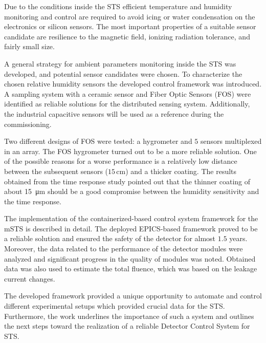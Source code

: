 Due to the conditions inside the \gls{STS} efficient temperature and humidity monitoring and control are required to avoid icing or water condensation on the electronics or silicon sensors. The most important properties of a suitable sensor candidate are resilience to the magnetic field, ionizing radiation tolerance, and fairly small size.

A general strategy for ambient parameters monitoring inside the \gls{STS} was developed, and potential sensor candidates were chosen. To characterize the chosen relative humidity sensors the developed control framework was introduced. A sampling system with a ceramic sensor and Fiber Optic Sensors (\gls{FOS}) were identified as reliable solutions for the distributed sensing system. Additionally, the industrial capacitive sensors will be used as a reference during the commissioning.

Two different designs of \gls{FOS} were tested: a hygrometer and $5$ sensors multiplexed in an array. The \gls{FOS} hygrometer turned out to be a more reliable solution. One of the possible reasons for a worse performance is a relatively low distance between the subsequent sensors ($15$\,cm) and a thicker coating. The results obtained from the time response study pointed out that the thinner coating of about \SI{15}{\micro\metre} should be a good compromise between the humidity sensitivity and the time response. 

The implementation of the containerized-based control system framework for the \gls{mSTS} is described in detail. The deployed EPICS-based framework proved to be a reliable solution and ensured the safety of the detector for almost $1.5$ years. Moreover, the data related to the performance of the detector modules were analyzed and significant progress in the quality of modules was noted. Obtained data was also used to estimate the total fluence, which was based on the leakage current changes. 

The developed framework provided a unique opportunity to automate and control different experimental setups which provided crucial data for the \gls{STS}. Furthermore, the work underlines the importance of such a system and outlines the next steps toward the realization of a reliable Detector Control System for \gls{STS}.